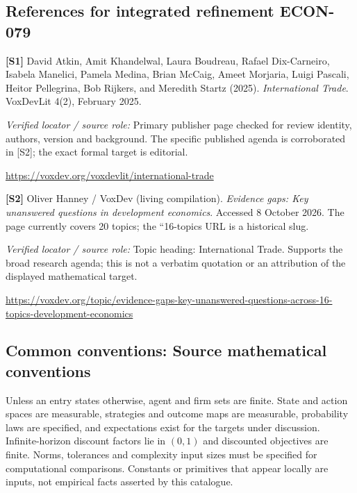 \documentclass[11pt,a4paper]{article}
\begin{document}
\subsection*{References for integrated refinement ECON-079}
{\footnotesize\raggedright
\par\noindent\textbf{[S1]} David Atkin, Amit Khandelwal, Laura Boudreau, Rafael Dix-Carneiro, Isabela Manelici, Pamela Medina, Brian McCaig, Ameet Morjaria, Luigi Pascali, Heitor Pellegrina, Bob Rijkers, and Meredith Startz (2025). \emph{International Trade}. VoxDevLit 4(2), February 2025.\par \textit{Verified locator / source role:} Primary publisher page checked for review identity, authors, version and background. The specific published agenda is corroborated in [S2]; the exact formal target is editorial.\par \url{https://voxdev.org/voxdevlit/international-trade}\par\smallskip
\par\noindent\textbf{[S2]} Oliver Hanney / VoxDev (living compilation). \emph{Evidence gaps: Key unanswered questions in development economics}. Accessed 8 October 2026. The page currently covers 20 topics; the ``16-topics URL is a historical slug.\par \textit{Verified locator / source role:} Topic heading: International Trade. Supports the broad research agenda; this is not a verbatim quotation or an attribution of the displayed mathematical target.\par \url{https://voxdev.org/topic/evidence-gaps-key-unanswered-questions-across-16-topics-development-economics}\par\smallskip
}

\subsection*{Common conventions: Source mathematical conventions}

Unless an entry states otherwise, agent and firm sets are finite. State and action spaces are measurable, strategies and outcome maps are measurable, probability laws are specified, and expectations exist for the targets under discussion. Infinite-horizon discount factors lie in $(0,1)$ and discounted objectives are finite. Norms, tolerances and complexity input sizes must be specified for computational comparisons. Constants or primitives that appear locally are inputs, not empirical facts asserted by this catalogue.
\end{document}
